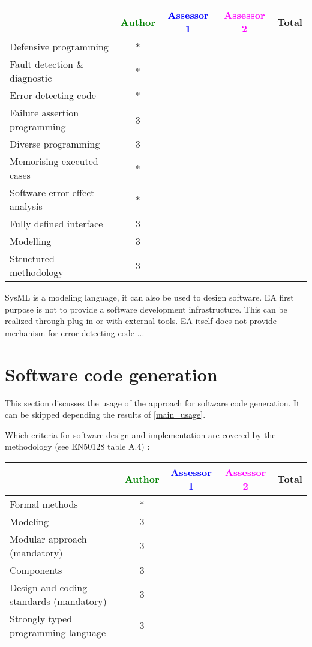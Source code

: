 \begin{tabular}{|l | c | c | c | c|}
\hline
& \textcolor{green}{Author} & \textcolor{blue}{Assessor 1} & \textcolor{magenta}{Assessor 2} & Total \\
\hline
Defensive programming  &* & & &  \\
\hline 
Fault detection \& diagnostic  &* & & &  \\
\hline
Error detecting code  &* & & &  \\
\hline
Failure assertion programming &3 & & &  \\
\hline
Diverse programming &3 & & &  \\
\hline
Memorising executed cases &* & & &  \\
\hline
Software error effect analysis &* & & &  \\
\hline
Fully defined interface &3 & & &  \\
\hline
Modelling  &3 & & &  \\
\hline
Structured methodology &3 & & &  \\
\hline
\end{tabular}
\begin{author_comment}
SysML is a modeling language, it can also be used to design
software. EA first purpose is not to provide a software development
infrastructure. This can be realized through plug-in or with external
tools.
EA itself does not provide mechanism for error detecting code ...
\end{author_comment}

\section{Software code generation}
This section discusses the usage of the approach for software code generation.
It can be skipped depending the results of \ref{main_usage}.

Which criteria for software design and implementation are covered by the methodology
(see EN50128 table A.4) :

\begin{tabular}{|l | c | c | c | c|}
\hline
& \textcolor{green}{Author} & \textcolor{blue}{Assessor 1} & \textcolor{magenta}{Assessor 2} & Total \\
\hline
Formal methods  &* & & &  \\
\hline 
Modeling  &3 & & &  \\
\hline
Modular approach (mandatory) &3 & & &  \\
\hline
Components &3 & & &  \\
\hline
Design and coding standards (mandatory) &3 & & &  \\
\hline
Strongly typed programming language &3 & & &  \\
\hline

\end{tabular}



